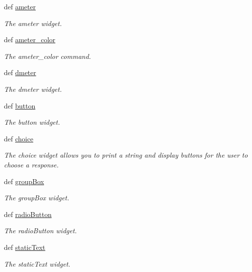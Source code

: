 \begin{DoxyCompactItemize}
def \hyperlink{group___widgets_ga437287c80e84027b6b9bebfe31764202}{ameter}
\begin{DoxyCompactList}\small\item\em The ameter widget. \end{DoxyCompactList}\item 
def \hyperlink{group___widgets_gabe969d0e420d69f79a659f115e810acd}{ameter\-\_\-color}
\begin{DoxyCompactList}\small\item\em The ameter\-\_\-color command. \end{DoxyCompactList}\item 
def \hyperlink{group___widgets_gae047f70bd7485eafe1e352282cf3c999}{dmeter}
\begin{DoxyCompactList}\small\item\em The dmeter widget. \end{DoxyCompactList}\item 
def \hyperlink{group___widgets_ga6ce046794cbbfa9236c745b712fd2d6d}{button}
\begin{DoxyCompactList}\small\item\em The button widget. \end{DoxyCompactList}\item 
def \hyperlink{group___widgets_gaae5f45e0ca7c8a0294c75b786d728992}{choice}
\begin{DoxyCompactList}\small\item\em The choice widget allows you to print a string and display buttons for the user to choose a response. \end{DoxyCompactList}\item 
def \hyperlink{group___widgets_ga189db08deeaf2ff69fad7e7e3612fe5b}{group\-Box}
\begin{DoxyCompactList}\small\item\em The group\-Box widget. \end{DoxyCompactList}\item 
def \hyperlink{group___widgets_gaef2c149d7df7f92b718a8660fd0db245}{radio\-Button}
\begin{DoxyCompactList}\small\item\em The radio\-Button widget. \end{DoxyCompactList}\item 
def \hyperlink{group___widgets_gacee37e549f8a877a715b68d39460f7b7}{static\-Text}
\begin{DoxyCompactList}\small\item\em The static\-Text widget. \end{DoxyCompactList}\item 

\end{DoxyCompactItemize}
